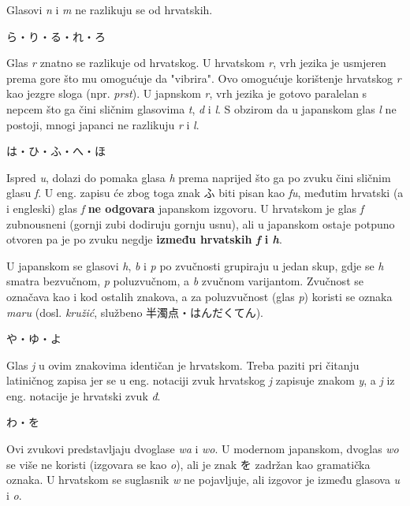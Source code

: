 	Glasovi \textit{n} i \textit{m} ne razlikuju se od hrvatskih.
	
	\vspace{5pt}
	\noindent\ten ら・り・る・れ・ろ
	
	Glas \textit{r} znatno se razlikuje od hrvatskog. U hrvatskom \textit{r}, vrh jezika je usmjeren prema gore što mu omogućuje da "vibrira". Ovo omogućuje korištenje hrvatskog \textit{r} kao jezgre sloga (npr. \textit{prst}). U japnskom \textit{r}, vrh jezika je gotovo paralelan s nepcem što ga čini sličnim glasovima \textit{t}, \textit{d} i \textit{l}. S obzirom da u japanskom glas \textit{l} ne postoji, mnogi japanci ne razlikuju \textit{r} i \textit{l}.
	
	\vspace{5pt}
	\noindent\ten は・ひ・ふ・へ・ほ
	
	Ispred \textit{u}, dolazi do pomaka glasa \textit{h} prema naprijed što ga po zvuku čini sličnim glasu \textit{f}. U eng. zapisu će zbog toga znak ふ biti pisan kao \textit{fu}, međutim hrvatski (a i engleski) glas \textit{f} \textbf{ne odgovara} japanskom izgovoru. U hrvatskom je glas \textit{f} zubnousneni (gornji zubi dodiruju gornju usnu), ali u japanskom ostaje potpuno otvoren pa je po zvuku negdje \textbf{između hrvatskih \textit{f} i \textit{h}}.
	
	U japanskom se glasovi \textit{h}, \textit{b} i \textit{p} po zvučnosti grupiraju u jedan skup, gdje se \textit{h} smatra bezvučnom, \textit{p} poluzvučnom\footnotemark[2], a \textit{b} zvučnom varijantom. Zvučnost se označava kao i kod ostalih znakova, a za poluzvučnost (glas \textit{p}) koristi se oznaka \textit{maru} (dosl. \textit{kružić}, službeno 半濁点・はんだくてん).
	
	
	\vspace{5pt}
	\noindent\ten や・ゆ・よ
	
	Glas \textit{j} u ovim znakovima identičan je hrvatskom. Treba paziti pri čitanju latiničnog zapisa jer se u eng. notaciji zvuk hrvatskog \textit{j} zapisuje znakom \textit{y}, a \textit{j} iz eng. notacije je hrvatski zvuk \textit{đ}.
	
	\vspace{5pt}
	\noindent\ten わ・を
	
	Ovi zvukovi predstavljaju dvoglase \textit{wa} i \textit{wo}. U modernom japanskom, dvoglas \textit{wo} se više ne koristi (izgovara se kao \textit{o}), ali je znak を zadržan kao gramatička oznaka. U hrvatskom se suglasnik \textit{w} ne pojavljuje, ali izgovor je između glasova \textit{u} i \textit{o}.
	
